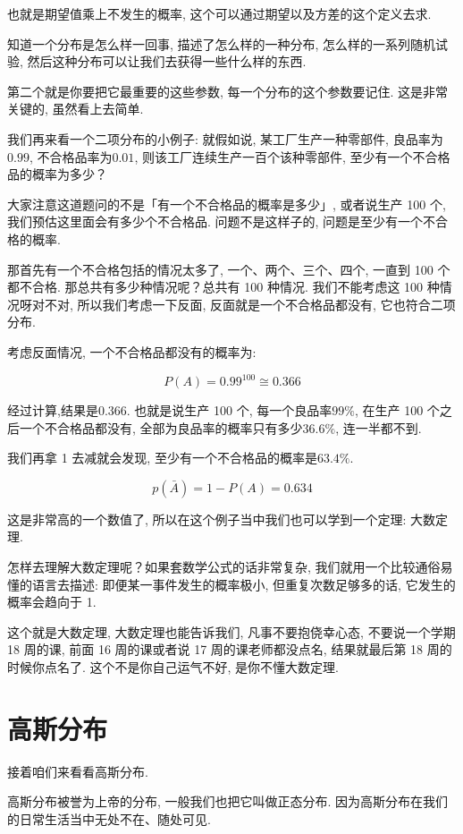 也就是期望值乘上不发生的概率, 这个可以通过期望以及方差的这个定义去求. 

知道一个分布是怎么样一回事, 描述了怎么样的一种分布, 怎么样的一系列随机试验, 然后这种分布可以让我们去获得一些什么样的东西. 

第二个就是你要把它最重要的这些参数, 每一个分布的这个参数要记住. 这是非常关键的, 虽然看上去简单. 

我们再来看一个二项分布的小例子: 就假如说, 某工厂生产一种零部件, 良品率为$0.99$, 不合格品率为$0.01$,  则该工厂连续生产一百个该种零部件, 至少有一个不合格品的概率为多少？

大家注意这道题问的不是「有一个不合格品的概率是多少」, 或者说生产 100 个, 我们预估这里面会有多少个不合格品. 问题不是这样子的, 问题是至少有一个不合格的概率. 

那首先有一个不合格包括的情况太多了, 一个、两个、三个、四个, 一直到 100 个都不合格. 那总共有多少种情况呢？总共有 100 种情况. 我们不能考虑这 100 种情况呀对不对, 所以我们考虑一下反面, 反面就是一个不合格品都没有, 它也符合二项分布. 

考虑反面情况, 一个不合格品都没有的概率为: 

\[P(A) = 0.99^100 \cong 0.366\]

经过计算,结果是$0.366$. 也就是说生产 100 个, 每一个良品率$99\%$, 在生产 100 个之后一个不合格品都没有, 全部为良品率的概率只有多少$36.6\%$, 连一半都不到. 

我们再拿 1 去减就会发现, 至少有一个不合格品的概率是$63.4\%$. 

\[p(\bar A) = 1-P(A) = 0.634\]

这是非常高的一个数值了, 所以在这个例子当中我们也可以学到一个定理: 大数定理. 

怎样去理解大数定理呢？如果套数学公式的话非常复杂, 我们就用一个比较通俗易懂的语言去描述: 即便某一事件发生的概率极小, 但重复次数足够多的话,  它发生的概率会趋向于 1. 

这个就是大数定理, 大数定理也能告诉我们, 凡事不要抱侥幸心态, 不要说一个学期 18 周的课, 前面 16 周的课或者说 17 周的课老师都没点名, 结果就最后第 18 周的时候你点名了. 这个不是你自己运气不好, 是你不懂大数定理. 

\section{高斯分布}

接着咱们来看看高斯分布. 

高斯分布被誉为上帝的分布, 一般我们也把它叫做正态分布. 因为高斯分布在我们的日常生活当中无处不在、随处可见. 

